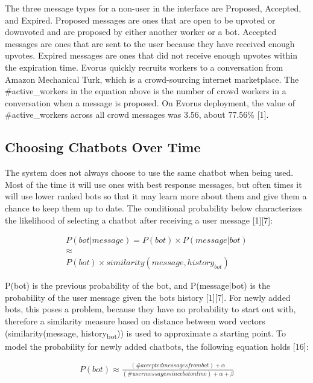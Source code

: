 \documentclass[letterpaper, 10 pt, conference]{IEEEtran}
\begin{document}
The three message types for a non-user in the interface are Proposed, Accepted, and Expired. Proposed messages are ones that are open to be upvoted or downvoted and are proposed by either another worker or a bot. Accepted messages are ones that are sent to the user because they have received enough upvotes. Expired messages are ones that did not receive enough upvotes within the expiration time. Evorus quickly recruits workers to a conversation from Amazon Mechanical Turk, which is a crowd-sourcing internet marketplace. The \#active\_workers in the equation above is the number of crowd workers in a conversation when a message is proposed. On Evorus deployment, the value of \#active\_workers across all crowd messages was 3.56, about 77.56\% [1].

\subsection{Choosing Chatbots Over Time}
The system does not always choose to use the same chatbot when being used. Most of the time it will use ones with best response messages, but often times it will use lower ranked bots so that it may learn more about them and give them a chance to keep them up to date. The conditional probability below characterizes the likelihood of selecting a chatbot after receiving a user message [1][7]:

\begin{equation}
\begin{gathered}
P(bot|message) = P(bot) \times P(message|bot) \\
\approx \\
P(bot) \times similarity(message, history_{bot})
\end{gathered}
\end{equation}

P(bot) is the previous probability of the bot, and P(message|bot) is the probability of the user message given the bots history [1][7]. For newly added bots, this poses a problem, because they have no probability to start out with, therefore a similarity measure based on distance between word vectors (similarity(message, history\textsubscript{bot})) is used to approximate a starting point. To model the probability for newly added chatbots, the following equation holds [16]:

\begin{equation}
\begin{gathered}
P(bot) \approx \frac{(\#accepted messages from bot) + \alpha}{(\#user messages since bot online) + \alpha + \beta}
\end{gathered}
\end{equation}
\end{document}
